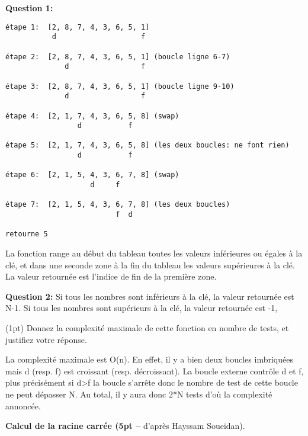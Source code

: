 \documentclass[10pt]{article}\usepackage[correction,nu]{esial}
\begin{document}
\begin{Reponse}
\noindent\textbf{Question 1:} 
\begin{Verbatim}[numbers=none]
étape 1:  [2, 8, 7, 4, 3, 6, 5, 1]
           d                    f

étape 2:  [2, 8, 7, 4, 3, 6, 5, 1] (boucle ligne 6-7)
              d                 f

étape 3:  [2, 8, 7, 4, 3, 6, 5, 1] (boucle ligne 9-10)
              d                 f

étape 4:  [2, 1, 7, 4, 3, 6, 5, 8] (swap)
                 d           f    

étape 5:  [2, 1, 7, 4, 3, 6, 5, 8] (les deux boucles: ne font rien)
                 d           f

étape 6:  [2, 1, 5, 4, 3, 6, 7, 8] (swap)
                    d     f   

étape 7:  [2, 1, 5, 4, 3, 6, 7, 8] (les deux boucles)
                          f  d 

retourne 5
\end{Verbatim}


La fonction range au début du tableau toutes les valeurs inférieures ou égales à
la clé, et dans une seconde zone à la fin du tableau les valeurs supérieures à
la clé. La valeur retournée est l'indice de fin de la première zone.


\noindent\textbf{Question 2:} 
Si tous les nombres sont inférieurs à la clé, la valeur retournée est N-1. Si tous les nombres sont
supérieurs à la clé, la valeur retournée est -1,
\end{Reponse}

\Question(1pt) Donnez la complexité maximale de cette fonction en nombre de tests, et
justifiez votre réponse.
\begin{Reponse}
  La complexité maximale est O(n). En effet, il y a bien deux boucles
  imbriquées mais d (resp. f) est croissant (resp. décroissant). La boucle
  externe contrôle d et f, plus précisément si d>f la boucle s'arrête donc le
  nombre de test de cette boucle ne peut dépasser N. Au total, il y aura donc
  2*N tests d'où la complexité annoncée.
\end{Reponse}

\Exercice \textbf{Calcul de la racine carrée (5pt -- } d'après Hayssam Soueidan).
\end{document}
